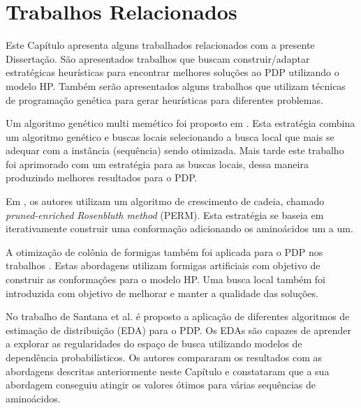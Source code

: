\chapter{Trabalhos Relacionados}
\label{cap:Trabalhos Relacionados}

Este Capítulo apresenta alguns trabalhados relacionados com a presente Dissertação. São apresentados trabalhos que buscam construir/adaptar estratégicas heurísticas para encontrar melhores soluções ao PDP utilizando o modelo HP. Também serão apresentados alguns trabalhos que utilizam técnicas de programação genética para gerar heurísticas para diferentes problemas.






Um algoritmo genético multi memético foi proposto em \cite{krasnogor2002multimeme}. Esta estratégia combina um algoritmo genético e buscas locais selecionando a busca local que mais se adequar com a instância (sequência) sendo otimizada. Mais tarde este trabalho foi aprimorado com um estratégia  para as buscas locais, dessa maneira produzindo melhores resultados para o PDP.

Em \cite{hsu2003growth}, os autores utilizam um algoritmo de crescimento de cadeia, chamado \textit{pruned-enriched Rosenbluth method} (PERM). Esta estratégia se baseia em iterativamente construir uma conformação adicionando os aminoácidos um a um. 

A otimização de colônia de formigas também foi aplicada para o PDP nos trabalhos \cite{shmygelska2002ant,shmygelska2003improved}. Estas abordagens utilizam formigas artificiais com objetivo de construir as conformações para o modelo HP. Uma busca local também foi introduzida com objetivo de melhorar e manter a qualidade das soluções. 

No trabalho de Santana et al. \cite{santana2008protein} é proposto a aplicação de diferentes algoritmos de estimação de distribuição (EDA) para o PDP. Os EDAs são capazes de aprender a explorar as regularidades do espaço de busca utilizando modelos de dependência probabilísticos. Os autores compararam os resultados com as abordagens descritas anteriormente neste Capítulo e constataram que a sua abordagem conseguiu atingir os valores ótimos para várias sequências de aminoácidos.

